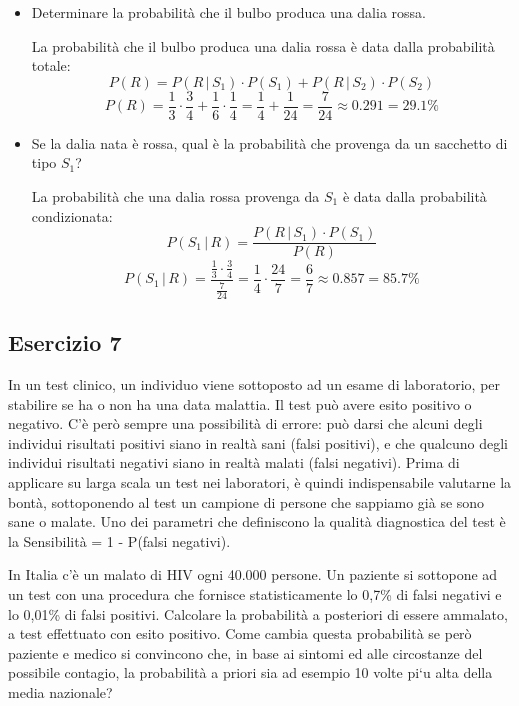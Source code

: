 \documentclass[a4paper]{article}
\theoremstyle{break}
\theoremstyle{break}
\theoremstyle{break}
\theoremstyle{break}
\begin{document}
\begin{itemize}
	\item Determinare la probabilità che il bulbo produca una dalia rossa.

	      \vspace{1em}
	      La probabilità che il bulbo produca una dalia rossa è data dalla probabilità totale:
	      \[
		      P(R) = P(R\,|\,S_1) \cdot P(S_1) + P(R\,|\,S_2) \cdot P(S_2)
	      \]
	      \[
		      P(R) = \frac{1}{3} \cdot \frac{3}{4} + \frac{1}{6} \cdot \frac{1}{4} = \frac{1}{4} + \frac{1}{24} = \frac{7}{24} \approx 0.291 = 29.1\%
	      \]
	\item Se la dalia nata è rossa, qual è la probabilità che provenga da un sacchetto di
	      tipo \( S_1 \)?

	      \vspace{1em}
	      La probabilità che una dalia rossa provenga da \( S_1 \) è data dalla probabilità
	      condizionata:
	      \[
		      P(S_1\,|\,R) = \frac{P(R\,|\,S_1) \cdot P(S_1)}{P(R)}
	      \]
	      \[
		      P(S_1\,|\,R) = \frac{\frac{1}{3} \cdot \frac{3}{4}}{\frac{7}{24}} = \frac{1}{4} \cdot \frac{24}{7} = \frac{6}{7} \approx 0.857 = 85.7\%
	      \]
\end{itemize}

\subsection{Esercizio 7}
In un test clinico, un individuo viene sottoposto ad un esame di laboratorio, per
stabilire se ha o non ha una data malattia. Il test può avere esito positivo o negativo.
C’è però sempre una possibilità di errore: può darsi che alcuni degli individui
risultati positivi siano in realtà sani (falsi positivi), e che qualcuno degli individui
risultati negativi siano in realtà malati (falsi negativi). Prima di applicare su larga
scala un test nei laboratori, è quindi indispensabile valutarne la bontà, sottoponendo
al test un campione di persone che sappiamo già se sono sane o malate. Uno dei parametri
che definiscono la qualità diagnostica del test è la Sensibilità = 1 - P(falsi negativi).

\noindent In Italia c’è un malato di HIV ogni 40.000 persone. Un paziente si sottopone
ad un test con una procedura che fornisce statisticamente lo 0,7\% di falsi negativi e lo
0,01\% di falsi positivi. Calcolare la probabilità a posteriori di essere ammalato, a
test effettuato con esito positivo. Come cambia questa probabilità se però paziente e
medico si convincono che, in base ai sintomi ed alle circostanze del possibile contagio,
la probabilità a priori sia ad esempio 10 volte pi`u alta della media nazionale?
\end{document}
